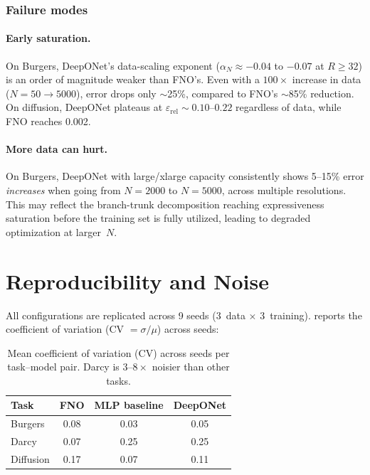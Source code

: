 \documentclass[11pt]{article}
\newcommand{\relLtwo}{\varepsilon_{\mathrm{rel}}}
\begin{document}
\subsubsection{Failure modes}

\paragraph{Early saturation.}
On Burgers, DeepONet's data-scaling exponent ($\alpha_N \approx
-0.04$ to $-0.07$ at $R \geq 32$) is an order of magnitude
weaker than FNO's. Even with a $100\times$ increase in data
($N = 50 \to 5000$), error drops only $\sim$25\%, compared to FNO's
$\sim$85\% reduction. On diffusion, DeepONet plateaus at
$\relLtwo \sim 0.10$--$0.22$ regardless of data, while FNO
reaches 0.002.

\paragraph{More data can hurt.}
On Burgers, DeepONet with large/xlarge capacity consistently
shows 5--15\% error \emph{increases} when going from $N = 2000$
to $N = 5000$, across multiple resolutions. This may reflect
the branch-trunk decomposition reaching expressiveness saturation
before the training set is fully utilized, leading to degraded
optimization at larger~$N$.


\section{Reproducibility and Noise}
\label{sec:noise}

All configurations are replicated across 9 seeds
(3~data $\times$ 3~training).  reports the
coefficient of variation (CV $= \sigma / \mu$) across seeds:

\begin{table}[h]
\centering
\caption{Mean coefficient of variation (CV) across seeds per
task--model pair. Darcy is $3$--$8\times$ noisier than other tasks.}
\label{tab:noise}
\begin{tabular}{@{}lccc@{}}
\toprule
\textbf{Task} & \textbf{FNO} & \textbf{MLP baseline} &
\textbf{DeepONet} \\
\midrule
Burgers   & 0.08 & 0.03 & 0.05 \\
Darcy     & 0.07 & 0.25 & 0.25 \\
Diffusion & 0.17 & 0.07 & 0.11 \\
\bottomrule
\end{tabular}
\end{table}
\end{document}
